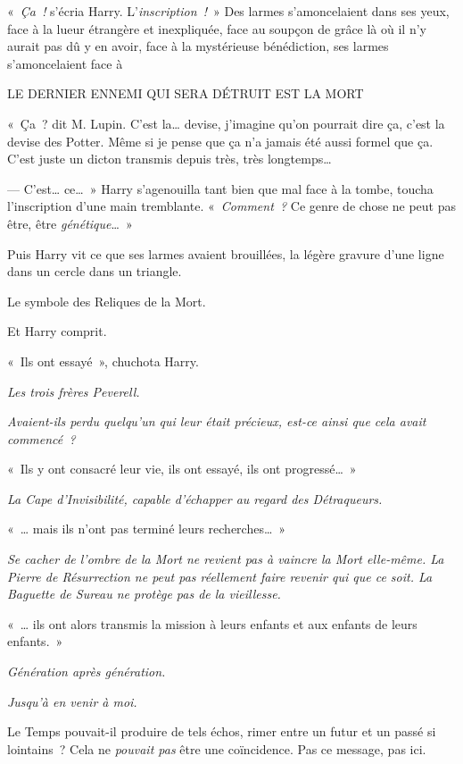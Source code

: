 «~\emph{Ça~!} s'écria Harry.
L'\emph{inscription~!}~» Des larmes s'amoncelaient dans ses yeux, face à la lueur étrangère et inexpliquée, face au soupçon de grâce là où il n'y aurait pas dû y en avoir, face à la mystérieuse bénédiction, ses larmes s'amoncelaient face à
\begin{center}
LE DERNIER ENNEMI QUI SERA DÉTRUIT EST LA MORT
\end{center}

«~Ça~? dit M. Lupin.
C'est la… devise, j'imagine qu'on pourrait dire ça, c'est la devise des Potter.
Même si je pense que ça n'a jamais été aussi formel que ça.
C'est juste un dicton transmis depuis très, très longtemps…

--- C'est… ce…~»
Harry s'agenouilla tant bien que mal face à la tombe, toucha l'inscription d'une main tremblante.
«~\emph{Comment~?} Ce genre de chose ne peut pas être, être \emph{génétique}…~»

Puis Harry vit ce que ses larmes avaient brouillées, la légère gravure d'une ligne dans un cercle dans un triangle.

Le symbole des Reliques de la Mort.

Et Harry comprit.

«~Ils ont essayé~», chuchota Harry.

\emph{Les trois frères Peverell.}

\emph{Avaient-ils perdu quelqu'un qui leur était précieux, est-ce ainsi que cela avait commencé~?}

«~Ils y ont consacré leur vie, ils ont essayé, ils ont progressé…~»

\emph{La Cape d'Invisibilité, capable d'échapper au regard des Détraqueurs.}

«~… mais ils n'ont pas terminé leurs recherches…~»

\emph{Se cacher de l'ombre de la Mort ne revient pas à vaincre la Mort elle-même.
La Pierre de Résurrection ne peut pas réellement faire revenir qui que ce soit.
La Baguette de Sureau ne protège pas de la vieillesse.}

«~… ils ont alors transmis la mission à leurs enfants et aux enfants de leurs enfants.~»

\emph{Génération après génération.}

\emph{Jusqu'à en venir à moi.}

Le Temps pouvait-il produire de tels échos, rimer entre un futur et un passé si lointains~?
Cela ne \emph{pouvait pas} être une coïncidence.
Pas ce message, pas ici.


